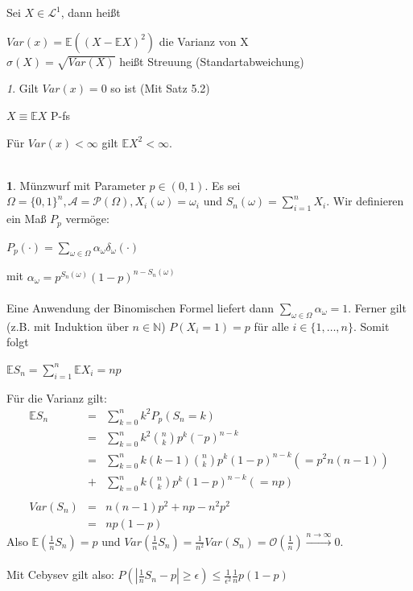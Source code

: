\documentclass[10pt,a4paper]{report}
\numberwithin{equation}{section}
\numberwithin{figure}{section}
\theoremstyle{plain}
\theoremstyle{definition}
\theoremstyle{plain}
\theoremstyle{definition}
\newtheorem{example}{\protect\examplename}[section]
\theoremstyle{remark}
\newtheorem{rem}{\protect\remarkname}[section]
\theoremstyle{plain}
\theoremstyle{plain}
\theoremstyle{plain}
\theoremstyle{plain}
\theoremstyle{plain}
\providecommand{\examplename}{Beispiel}
\providecommand{\remarkname}{Bemerkung}
\newcommand{\1}{ \mathbb{1} } %
\begin{document}
Sei $X \in \mathcal{L}^1$, dann heißt 
\begin{center}
$Var(x)=\mathbb{E}((X-\mathbb{E}X)^2)$ die Varianz von X\\
$\sigma(X)=\sqrt{Var(X)}$ heißt Streuung (Standartabweichung)
\end{center} 
\begin{rem}
  Gilt $Var(x)=0$ so ist (Mit Satz 5.2)
  \begin{center}
    $X\equiv \mathbb{E}X$ P-fs
  \end{center}
  Für $Var(x)<\infty$ gilt $\mathbb{E}X^2< \infty$.\\\\
\end{rem}
\begin{example}
  Münzwurf mit Parameter $p \in (0,1)$. Es sei $\Omega=\{0,1\}^n,
  \mathcal{A}=\mathcal{P}(\Omega), X_i(\omega)=\omega_i$ und
  $S_n(\omega)=\sum\limits_{i=1}^n X_i$. Wir definieren ein Maß $P_p$
  vermöge:
  \begin{center}
    $P_p(\cdot)=\sum\limits_{\omega \in \Omega}\alpha_\omega
    \delta_\omega(\cdot)$
  \end{center}
  mit $\alpha_\omega=p^{S_n(\omega)}(1-p)^{n-S_n(\omega)}$\\\\
  Eine Anwendung der Binomischen Formel liefert dann
  $\sum\limits_{\omega \in \Omega}\alpha_\omega=1$. Ferner gilt
  (z.B. mit Induktion über $n \in \mathbb{N}$) $P(X_i=1)=p$ für alle
  $i \in \{1,\dots,n\}$. Somit folgt
  \begin{center}
    $\mathbb{E}S_n=\sum\limits_{i=1}^n\mathbb{E}X_i=np$
  \end{center}
  Für die Varianz gilt:
  \begin{eqnarray*}
    \mathbb{E}S_n&=&\sum\limits_{k=0}^nk^2P_p(S_n=k)\\
    &=& \sum\limits_{k=0}^nk^2\binom{n}{k}p^k(^-p)^{n-k}\\
    &=&\sum\limits_{k=0}^nk(k-1)\binom{n}{k}p^k(1-p)^{n-k} (=p^2n(n-1))\\
    &+& \sum\limits_{k=0}^n k\binom{n}{k}p^k(1-p)^{n-k} (=np)\\\\
    Var(S_n)&=&n(n-1)p^2+np-n^2p^2\\
    &=&np(1-p)
  \end{eqnarray*}
  Also $\mathbb{E}\left(\frac{1}{n}S_n\right)=p$ und $Var\left(\frac{1}{n}S_n\right)=\frac{1}{n^2}Var(S_n)=\mathcal{O}\left(\frac{1}{n}\right) \overset{n \to \infty}{\to} 0$.\\\\
  Mit Cebysev gilt also: $P\left(\left|\frac{1}{n}S_n-p\right|\geq \epsilon\right)\leq \frac{1}{\epsilon^2}\frac{1}{n}p(1-p)$\\\\
\end{example}
\end{document}
